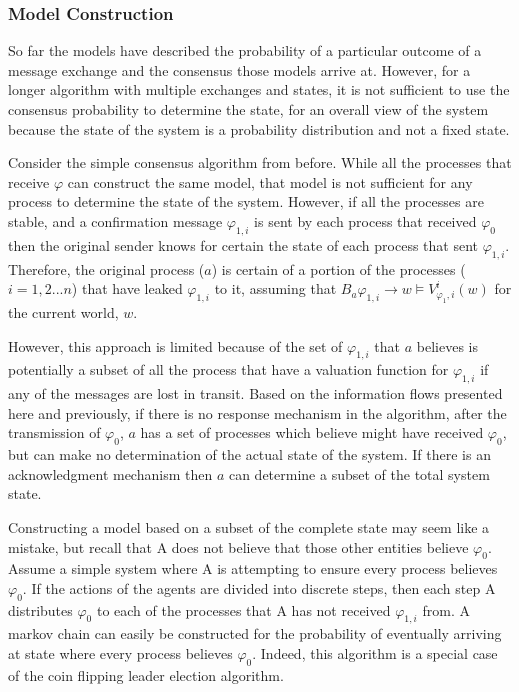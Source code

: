 \documentclass[12pt,oneside]{article}
\begin{document}
\subsubsection{Model Construction}

So far the models have described the probability of a particular outcome of a message exchange and the consensus those models arrive at. However, for a longer algorithm with multiple exchanges and states, it is not sufficient to use the consensus probability to determine the state, for an overall view of the system because the state of the system is a probability distribution and not a fixed state.

Consider the simple consensus algorithm from before. While all the processes that receive $\varphi$ can construct the same model, that model is not sufficient for any process to determine the state of the system. However, if all the processes are stable, and a confirmation message $\varphi_{1,i}$ is sent by each process that received $\varphi_0$ then the original sender knows for certain the state of each process that sent $\varphi_{1,i}$. Therefore, the original process ($a$) is certain of a portion of the processes ($i=1,2...n$) that have leaked $\varphi_{1,i}$ to it, assuming that $B_a \varphi_{1,i} \rightarrow w \vDash V_{\varphi_1,i}^i(w)$ for the current world, $w$.

However, this approach is limited because of the set of $\varphi_{1,i}$ that $a$ believes is potentially a subset of all the process that have a valuation function for $\varphi_{1,i}$ if any of the messages are lost in transit. Based on the information flows presented here and previously, if there is no response mechanism in the algorithm, after the transmission of $\varphi_0$, $a$ has a set of processes which believe might have received $\varphi_0$, but can make no determination of the actual state of the system. If there is an acknowledgment mechanism then $a$ can determine a subset of the total system state. 

Constructing a model based on a subset of the complete state may seem like a mistake, but recall that A does not believe that those other entities believe $\varphi_0$. Assume a simple system where A is attempting to ensure every process believes $\varphi_0$. If the actions of the agents are divided into discrete steps, then each step A distributes $\varphi_0$ to each of the processes that A has not received $\varphi_{1,i}$ from. A markov chain can easily be constructed for the probability of eventually arriving at state where every process believes $\varphi_0$. Indeed, this algorithm is a special case of the coin flipping leader election algorithm.
\end{document}
